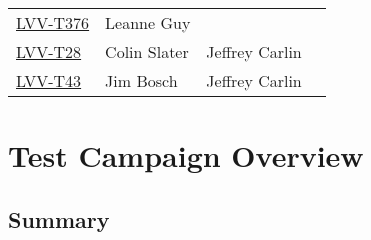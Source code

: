\documentclass[DM,lsstdraft,STR,toc]{lsstdoc}
\begin{document}
\begin{longtable}{p{3cm}p{3cm}p{3cm}p{6cm}}
\begin{minipage}[]{6cm}
\smallskip
{\small  }
\medskip
\end{minipage}
\\ \hline
\href{https://jira.lsstcorp.org/secure/Tests.jspa#/testCase/LVV-T376}{LVV-T376}
& {\small Leanne Guy } & {\small  } &
\begin{minipage}[]{6cm}
\smallskip
{\small  }
\medskip
\end{minipage}
\\ \hline
\href{https://jira.lsstcorp.org/secure/Tests.jspa#/testCase/LVV-T28}{LVV-T28}
& {\small Colin Slater } & {\small Jeffrey Carlin } &
\begin{minipage}[]{6cm}
\smallskip
{\small  }
\medskip
\end{minipage}
\\ \hline
\href{https://jira.lsstcorp.org/secure/Tests.jspa#/testCase/LVV-T43}{LVV-T43}
& {\small Jim Bosch } & {\small Jeffrey Carlin } &
\begin{minipage}[]{6cm}
\smallskip
{\small  }
\medskip
\end{minipage}
\\ \hline
\end{longtable}

\newpage

\section{Test Campaign Overview}
\label{sect:overview}

\subsection{Summary}
\label{sect:summarytable}
\end{document}
